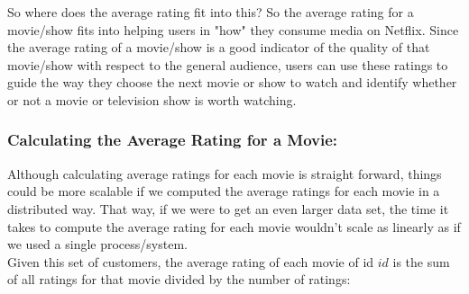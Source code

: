 \documentclass{article}
\begin{document}
So where does the average rating fit into this? So the average rating for a movie/show fits into helping users in "how" they consume media on Netflix. Since the average rating of a movie/show is a good indicator of the quality of that movie/show with respect to the general audience, users can use these ratings to guide the way they choose the next movie or show to watch and identify whether or not a movie or television show is worth watching. 

\subsubsection*{Calculating the Average Rating for a Movie:}
Although calculating average ratings for each movie is straight forward, things could be more scalable if we computed the average ratings for each movie in a distributed way. That way, if we were to get an even larger data set, the time it takes to compute the average rating for each movie wouldn't scale as linearly as if we used a single process/system.\\

\noindent Given this set of customers,  the average rating of each movie of id $id$ is the sum of all ratings for that movie divided by the number of ratings:
\end{document}
